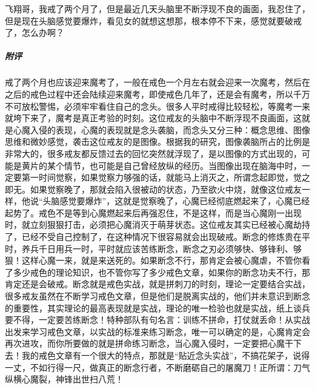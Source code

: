 \begin{case}
    飞翔哥，我戒了两个月了，但是最近几天头脑里不断浮现不良的画面，我忍住了，但是现在头脑感觉要爆炸，看见女的就想这想那，根本停不下来，感觉就要破戒了，怎么办啊？
    \subparagraph{附评} 戒了两个月也应该迎来魔考了，一般在戒色一个月左右就会迎来一次魔考，然后在之后的戒色过程中还会陆续迎来魔考，即使戒色几年了，还是会有魔考，所以千万不可放松警惕，必须牢牢看住自己的念头。很多人平时戒得比较轻松，等魔考一来就垮下来了，魔考是真正考验的时刻。这位戒友的头脑中不断浮现不良画面，这就是心魔入侵的表现，心魔的表现就是念头袭脑，而念头又分三种：概念思维、图像思维和微妙感觉，袭击这位戒友的是图像。根据我的研究，图像袭脑所占的比例是非常大的，很多戒友都反馈过去的回忆突然就浮现了，是以图像的方式出现的，可能是黄片的某个情节，也可能是自己曾经放纵的经历。当图像出现在脑海中时，一定要第一时间觉察，如果觉察力够强的话，就能马上消灭之，所谓念起即觉，觉之即无。如果觉察晚了，那就会陷入很被动的状态，乃至欲火中烧，就像这位戒友一样，他说“头脑感觉要爆炸”，这就是觉察晚了，心魔已经彻底燃起来了，心魔已经起势了。戒色不是等到心魔燃起来后再强忍住，不是这样，而是当心魔刚一出现时，就立刻狠狠打击，必须把心魔消灭于萌芽状态。这位戒友其实已经被心魔劫持了，已经不受自己控制了，在这种情况下很容易就会出现破戒。断念的修炼贵在平时，养兵千日用兵一时，平时就应该苦练断念，断念之刃必须够快、够锋利、够狠！这样心魔一来，就是来送死的。如果断念不行，那肯定会被心魔虐，不管你看了多少戒色的理论知识，也不管你写了多少戒色文章，如果你的断念功夫不行，那肯定还是会破戒。断念就是戒色实战，就是拼刺刀的时刻，理论一定要结合实战，很多戒友虽然在不断学习戒色文章，但是他们是脱离实战的，他们并未意识到断念的重要性，其实理论的最高表现就是实战，理论的唯一检验也就是实战，纸上谈兵要不得，一定要苦练断念！特种部队有句名言：训练不拼命，打仗就丢命！从实战出发来学习戒色文章，以实战的标准来练习断念，唯一可以确定的是，心魔肯定会再次进攻，而你所要做的就是拼命练习断念，当心魔入侵时，一定要把心魔干下去！我的戒色文章有一个很大的特点，那就是“贴近念头实战”，不搞花架子，说得一丈，不如行得一尺，做真正的断念行者，不断磨砺自己的屠魔刀！正所谓：刀气纵横心魔裂，神锋出世扫八荒！
\end{case}

